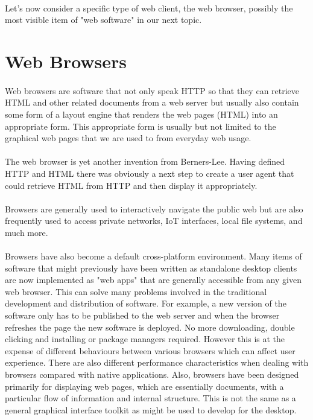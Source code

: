 \paragraph{} Let's now consider a specific type of web client, the web browser, possibly the most visible item of "web software" in our next topic.


\section{Web Browsers}
\paragraph{} Web browsers are software that not only speak HTTP so that they can retrieve HTML and other related documents from a web server but usually also contain some form of a layout engine that renders the web pages (HTML) into an appropriate form. This appropriate form is usually but not limited to the graphical web pages that we are used to from everyday web usage.
\paragraph{} The web browser is yet another invention from Berners-Lee. Having defined HTTP and HTML there was obviously a next step to create a user agent that could retrieve HTML from HTTP and then display it appropriately.
\paragraph{} Browsers are generally used to interactively navigate the public web but are also frequently used to access private networks, IoT interfaces, local file systems, and much more. 
\paragraph{} Browsers have also become a default cross-platform environment. Many items of software that might previously have been written as standalone desktop clients are now implemented as "web apps" that are generally accessible from any given web browser. This can solve many problems involved in the traditional development and distribution of software. For example, a new version of the software only has to be published to the web server and when the browser refreshes the page the new software is deployed. No more downloading, double clicking and installing or package managers required. However this is at the expense of different behaviours between various browsers which can affect user experience. There are also different performance characteristics when dealing with browsers compared with native applications. Also, browsers have been designed primarily for displaying web pages, which are essentially documents, with a particular flow of information and internal structure. This is not the same as a general graphical interface toolkit as might be used to develop for the desktop.
